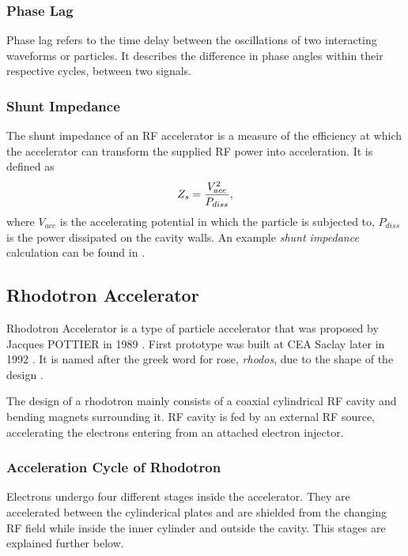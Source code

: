\documentclass{article}
\begin{document}
\subsubsection{Phase Lag}
Phase lag refers to the time delay between the oscillations of two interacting waveforms or particles. 
It describes the difference in phase angles within their respective cycles, between two signals. 

\subsubsection{Shunt Impedance}
The shunt impedance of an RF accelerator is a measure of the efficiency 
at which the accelerator can transform the supplied RF power into acceleration.
It is defined as
\vspace{-10pt}\begin{equation} \label{eq:shunt}
    Z_s = \frac{V_{acc}^2}{P_{diss}}  ,
\vspace{-10pt}\end{equation}
where $V_{acc}$ is the accelerating potential in which the particle is subjected to, 
$P_{diss}$ is the power dissipated on the cavity walls. 
An example \textit{shunt impedance} calculation can be found in .


\subsection{Rhodotron Accelerator} \label{sec:theory_rhodo}

Rhodotron Accelerator is a type of particle accelerator that was proposed by Jacques POTTIER in 1989 \cite{rhodo_pottier}. 
First prototype was built at CEA Saclay later in 1992 \cite{rhodo_prototype}. It is named after the greek word for rose, \textit{rhodos}, due to the shape of the design \cite{rhodos}.

The design of a rhodotron mainly consists of a coaxial cylindrical RF cavity and bending magnets surrounding it. RF cavity is fed by an external RF source, accelerating the electrons entering from an attached electron injector.


\subsubsection{Acceleration Cycle of Rhodotron}

Electrons undergo four different stages inside the accelerator. 
They are accelerated between the cylinderical plates and are shielded from the changing RF field while inside the inner cylinder and outside the cavity. 
This stages are explained further below.
\end{document}
